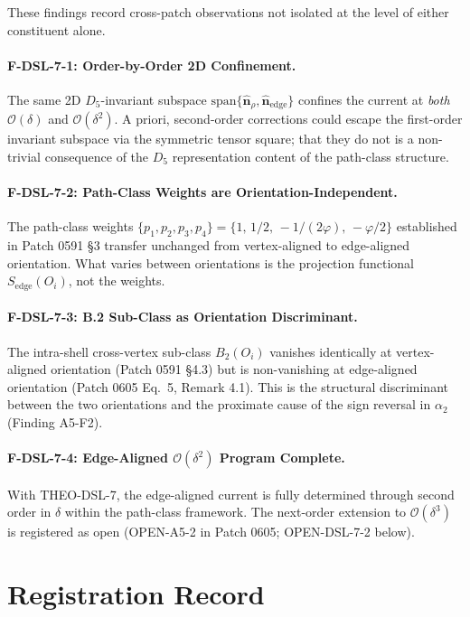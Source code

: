 \documentclass[11pt]{article}
\begin{document}
These findings record cross-patch observations not isolated at the level
of either constituent alone.

\paragraph{F-DSL-7-1: Order-by-Order 2D Confinement.}
The same 2D $D_5$-invariant subspace
$\mathrm{span}\{\hat{\mathbf{n}}_\rho, \hat{\mathbf{n}}_{\text{edge}}\}$
confines the current at \emph{both} $\mathcal{O}(\delta)$ and
$\mathcal{O}(\delta^2)$. A priori, second-order corrections could escape
the first-order invariant subspace via the symmetric tensor square; that
they do not is a non-trivial consequence of the $D_5$ representation
content of the path-class structure.

\paragraph{F-DSL-7-2: Path-Class Weights are Orientation-Independent.}
The path-class weights
$\{p_1, p_2, p_3, p_4\} = \{1,\, 1/2,\, -1/(2\varphi),\, -\varphi/2\}$
established in Patch 0591 §3 transfer unchanged from vertex-aligned to
edge-aligned orientation. What varies between orientations is the
projection functional $S_{\text{edge}}(O_i)$, not the weights.

\paragraph{F-DSL-7-3: B.2 Sub-Class as Orientation Discriminant.}
The intra-shell cross-vertex sub-class $B_2(O_i)$ vanishes identically at
vertex-aligned orientation (Patch 0591 §4.3) but is non-vanishing at
edge-aligned orientation (Patch 0605 Eq.~5, Remark 4.1). This is the
structural discriminant between the two orientations and the proximate
cause of the sign reversal in $\alpha_2$ (Finding A5-F2).

\paragraph{F-DSL-7-4: Edge-Aligned $\mathcal{O}(\delta^2)$ Program Complete.}
With THEO-DSL-7, the edge-aligned current is fully determined through
second order in $\delta$ within the path-class framework. The
next-order extension to $\mathcal{O}(\delta^3)$ is registered as open
(OPEN-A5-2 in Patch 0605; OPEN-DSL-7-2 below).

\section{Registration Record}
\end{document}
